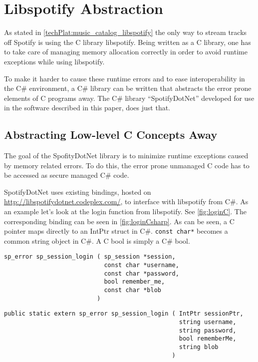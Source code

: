 \section{Libspotify Abstraction}
\label{imp:libspotify}
As stated in \cref{techPlat:music_catalog_libspotify} the only way to stream tracks off Spotify is using the C library libspotify. Being written as a C library, one has to take care of managing memory allocation correctly in order to avoid runtime exceptions while using libspotify.

To make it harder to cause these runtime errors and to ease interoperability in the C\# environment, a C\# library can be written that abstracts the error prone elements of C programs away. The C\# library \enquote{SpotifyDotNet} developed for use in the software described in this paper, does just that.

\subsection{Abstracting Low-level C Concepts Away}
\label{libspotify:abstracting_low_level_c_concepts_away}

The goal of the SpofityDotNet library is to minimize runtime exceptions caused by memory related errors. To do this, the error prone unmanaged C code has to be accessed as secure managed C\# code.

SpotifyDotNet uses existing bindings, hosted on \url{http://libspotifydotnet.codeplex.com/}, to interface with libspotify from C\#. As an example let's look at the login function from libspotify. See \cref{fig:loginC}. The corresponding binding can be seen in \cref{fig:loginCsharp}. As can be seen, a C pointer maps directly to an IntPtr struct in C\#. \lstinline|const char*| becomes a common string object in C\#. A C bool is simply a C\# bool.

\begin{lstlisting}[float, floatplacement=htpb,caption = {Libspotify login function prototype - C}, label = {fig:loginC}]
sp_error sp_session_login ( sp_session *session,
                            const char *username,
                            const char *password,
                            bool remember_me,
                            const char *blob
                          )
\end{lstlisting}

\begin{lstlisting}[float, floatplacement=htpb,caption = {Login method using a external implementation from libspotify.dll - C\#}, label={fig:loginCsharp}]
public static extern sp_error sp_session_login ( IntPtr sessionPtr,
                                                 string username,
                                                 string password,
                                                 bool rememberMe,
                                                 string blob
                                               )
\end{lstlisting}

